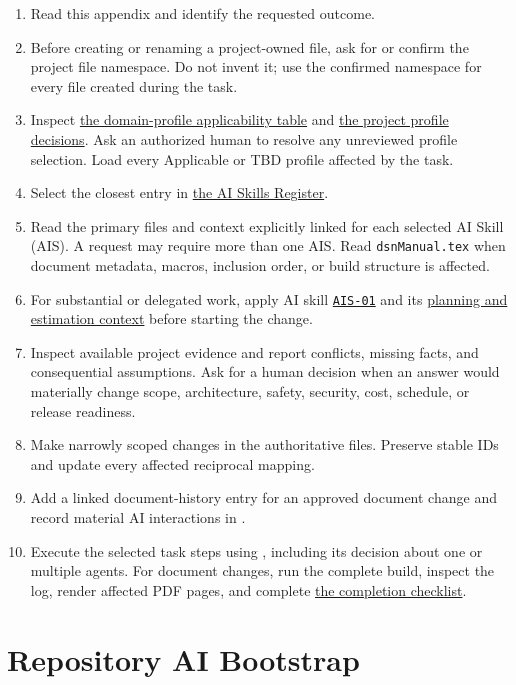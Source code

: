 \begin{enumerate}
\item Read this appendix and identify the requested outcome.
\item Before creating or renaming a project-owned file, ask for or confirm the
project file namespace. Do not invent it; use the confirmed namespace for every
file created during the task.
\item Inspect \hyperref[Table:DomainProfileApplicability]{the domain-profile
applicability table} and \hyperref[Table:ProjectDomainProfiles]{the project
profile decisions}. Ask an authorized human to resolve any unreviewed profile
selection. Load every Applicable or TBD profile affected by the task.
\item Select the closest entry in
\hyperref[Table:AISkills]{the AI Skills Register}.
\item Read the primary files and context explicitly linked for each selected
AI Skill (AIS). A request may require more than one AIS. Read
\texttt{dsnManual.tex} when document metadata, macros, inclusion order, or
build structure is affected.
\item For substantial or delegated work, apply AI skill \hyperref[Skill:AIS-01]{\texttt{AIS-01}}
and its \hyperref[Section:AIPlanningEstimateContext]{planning and estimation
context} before starting the change.
\item Inspect available project evidence and report conflicts, missing facts,
and consequential assumptions. Ask for a human decision when an answer would
materially change scope, architecture, safety, security, cost, schedule, or
release readiness.
\item Make narrowly scoped changes in the authoritative files. Preserve stable
IDs and update every affected reciprocal mapping.
\item Add a linked document-history entry for an approved document change and
record material AI interactions in .
\item Execute the selected task steps using
, including its decision about one or
multiple agents. For document changes, run the complete build, inspect the log,
render affected PDF pages, and
complete \hyperref[Table:AICompletionChecklist]{the completion checklist}.
\end{enumerate}

\section{Repository AI Bootstrap}
\label{Section:AIRepositoryBootstrap}

